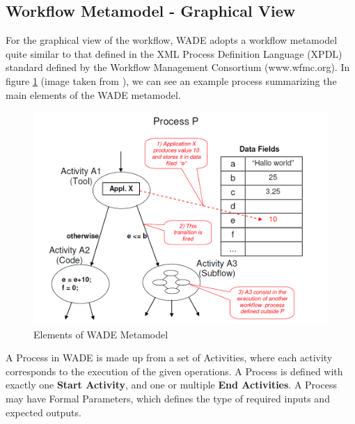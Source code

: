 \subsection{Workflow Metamodel - Graphical View}
For the graphical view of the workflow, WADE adopts a workflow metamodel quite similar to that defined in the XML Process Definition Language (XPDL) standard defined by the Workflow Management Consortium (www.wfmc.org). In figure \ref{fig:wade_elements} (image taken from \cite{GCDGMB08}), we can see an example process summarizing the main elements of the WADE metamodel.
\begin{figure}[h]
	\centering
		\includegraphics[width=1.00\textwidth]{images/wade_elements.png}
	\caption{Elements of WADE Metamodel \cite{GCDGMB08}}
	\label{fig:wade_elements}
\end{figure}

A Process in WADE is made up from a set of Activities, where each activity corresponds to the execution of the given operations. A Process is defined with exactly one \textbf{Start Activity}, and one or multiple \textbf{End Activities}. A Process may have Formal Parameters, which defines the type of required inputs and expected outputs.

